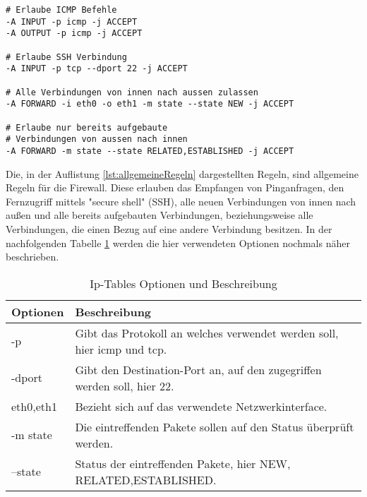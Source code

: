 \newline
\lstset{
	basicstyle=\footnotesize, frame=tb,
	xleftmargin=.2\textwidth, xrightmargin=.2\textwidth
}
\begin{lstlisting}[caption={Weitere allgemeine Firewallregeln},label=lst:allgemeineRegeln]
# Erlaube ICMP Befehle
-A INPUT -p icmp -j ACCEPT
-A OUTPUT -p icmp -j ACCEPT

# Erlaube SSH Verbindung
-A INPUT -p tcp --dport 22 -j ACCEPT

# Alle Verbindungen von innen nach aussen zulassen
-A FORWARD -i eth0 -o eth1 -m state --state NEW -j ACCEPT

# Erlaube nur bereits aufgebaute 
# Verbindungen von aussen nach innen
-A FORWARD -m state --state RELATED,ESTABLISHED -j ACCEPT
\end{lstlisting}
\vspace{\baselineskip}
Die, in der Auflistung \ref{lst:allgemeineRegeln} dargestellten Regeln, sind allgemeine Regeln für die Firewall. Diese erlauben das Empfangen von Pinganfragen, den Fernzugriff mittels "secure shell" (SSH), alle neuen Verbindungen von innen nach außen und alle bereits aufgebauten Verbindungen, beziehungsweise alle Verbindungen, die einen Bezug auf eine andere Verbindung besitzen. In der nachfolgenden Tabelle \ref*{tab:iptablesOptionen} werden die hier verwendeten Optionen nochmals näher beschrieben.
\begin{table}[h]
	\centering
\begin{tabular}{|p{2cm}|p{13cm}|}
	\hline 
	Optionen & Beschreibung \\ 
	\hline 
	-p & Gibt das Protokoll an welches verwendet werden soll, hier icmp und tcp. \\ 
	\hline 
	-dport & Gibt den Destination-Port an, auf den zugegriffen werden soll, hier 22. \\ 
	\hline
	eth0,eth1 & Bezieht sich auf das verwendete Netzwerkinterface. \\ 
	\hline 
	-m state & Die eintreffenden Pakete sollen auf den Status überprüft werden. \\ 
	\hline 
	--state & Status der eintreffenden Pakete, hier NEW, RELATED,ESTABLISHED. \\ 
	\hline 
\end{tabular} 
\caption{Ip-Tables Optionen und Beschreibung} \label{tab:iptablesOptionen}
\end{table}
